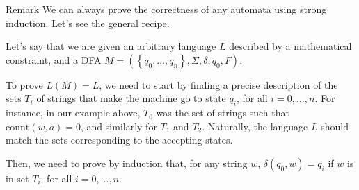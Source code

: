 \documentclass[a4paper]{article}
\begin{document}
\begin{parag}{Remark}
    We can always prove the correctness of any automata using strong induction. Let's see the general recipe. 

    Let's say that we are given an arbitrary language $L$ described by a mathematical constraint, and a DFA $M = \left(\left\{q_0, \ldots, q_n\right\}, \Sigma, \delta, q_0, F\right)$.

    To prove $L\left(M\right) = L$, we need to start by finding a precise description of the sets $T_i$ of strings that make the machine go to state $q_i$, for all $i = 0, \ldots, n$. For instance, in our example above, $T_0$ was the set of strings such that $\text{count}\left(w, a\right) = 0$, and similarly for $T_1$ and $T_2$. Naturally, the language $L$ should match the sets corresponding to the accepting states.

    Then, we need to prove by induction that, for any string $w$, $\delta\left(q_0, w\right) = q_i$ if $w$ is in set $T_i$; for all $i = 0, \ldots, n$.
\end{parag}
\end{document}
